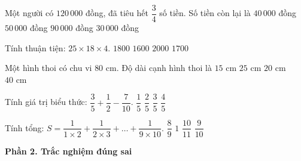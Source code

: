 \begin{ex} %
Một người có $120\,000$ đồng, đã tiêu hết $\dfrac{3}{4}$ số tiền. Số tiền còn lại là
\choice
{$40\,000$ đồng}
{$50\,000$ đồng}
{$90\,000$ đồng}
{\True $30\,000$ đồng}
\end{ex}

\begin{ex} %
Tính thuận tiện: $25 \times 18 \times 4$.
\choice
{\True $1800$}
{$1600$}
{$2000$}
{$1700$}
\end{ex}

\begin{ex} %
Một hình thoi có chu vi $80\text{ cm}$. Độ dài cạnh hình thoi là
\choice
{$15\text{ cm}$}
{$25\text{ cm}$}
{\True $20\text{ cm}$}
{$40\text{ cm}$}
\end{ex}

\begin{ex} %
Tính giá trị biểu thức: $\dfrac{3}{5} + \dfrac{1}{2} - \dfrac{7}{10}$.
\choice
{$\dfrac{1}{5}$}
{\True $\dfrac{2}{5}$}
{$\dfrac{3}{5}$}
{$\dfrac{4}{5}$}
\end{ex}

\begin{ex} %
Tính tổng: $S = \dfrac{1}{1 \times 2} + \dfrac{1}{2 \times 3} + \dots + \dfrac{1}{9 \times 10}$.
\choice
{$\dfrac{8}{9}$}
{$1$}
{$\dfrac{10}{11}$}
{\True $\dfrac{9}{10}$}
\end{ex}

\textbf{Phần 2. Trắc nghiệm đúng sai}


